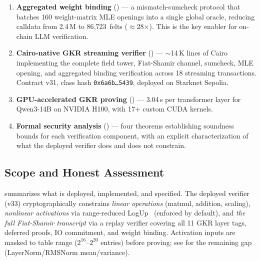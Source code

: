 \documentclass[10pt,twocolumn]{article}
\theoremstyle{definition}
\theoremstyle{remark}
\begin{document}
\begin{enumerate}[nosep,leftmargin=1.4em]
  \item \textbf{Aggregated weight binding} () ---
        a mismatch-sumcheck protocol that batches 160 weight-matrix
        MLE openings into a single global oracle, reducing calldata
        from 2.4\,M to 86{,}723~felts ($\approx$28$\times$).
        This is the key enabler for on-chain LLM verification.
  \item \textbf{Cairo-native GKR streaming verifier}
        () --- $\sim$14\,K lines of Cairo
        implementing the complete field tower, Fiat-Shamir channel,
        sumcheck, MLE opening, and aggregated binding verification
        across 18 streaming transactions.
        Contract v31, class hash
        \texttt{\small 0x6a6b\ldots5439}, deployed on Starknet Sepolia.
  \item \textbf{GPU-accelerated GKR proving}
        () --- 3.04\,s per transformer layer for
        Qwen3-14B on NVIDIA H100, with 17+ custom CUDA kernels.
  \item \textbf{Formal security analysis} () ---
        four theorems establishing soundness bounds for each
        verification component, with an explicit characterization of
        what the deployed verifier does and does not constrain.
\end{enumerate}

\subsection{Scope and Honest Assessment}

 summarizes what is deployed, implemented, and
specified.
The deployed verifier (v33) cryptographically constrains
\emph{linear operations} (matmul, addition, scaling),
\emph{nonlinear activations} via range-reduced
LogUp~\cite{habock2022logup} (enforced by default), and
\emph{the full Fiat-Shamir transcript} via a replay verifier
covering all 11 GKR layer tags, deferred proofs, IO commitment,
and weight binding.
Activation inputs are masked to table range ($2^{16}$--$2^{20}$
entries) before proving; see  for the
remaining gap (LayerNorm/RMSNorm mean/variance).
\end{document}
